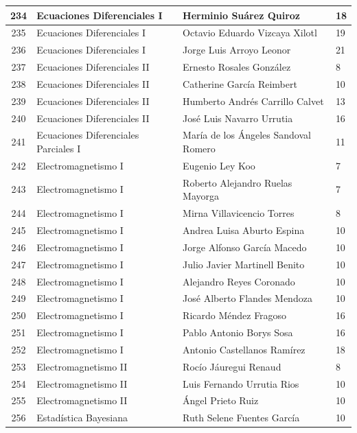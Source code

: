 {\begin{longtable}{|c|p{6.5cm}|p{5cm}|p{1.5cm}|}
  234 & Ecuaciones Diferenciales I & Herminio Suárez Quiroz & 18 \\ \hline
  235 & Ecuaciones Diferenciales I & Octavio Eduardo Vizcaya Xilotl & 19 \\ \hline
  236 & Ecuaciones Diferenciales I & Jorge Luis Arroyo Leonor & 21 \\ \hline
  237 & Ecuaciones Diferenciales II & Ernesto Rosales González & 8 \\ \hline
  238 & Ecuaciones Diferenciales II & Catherine García Reimbert & 10 \\ \hline
  239 & Ecuaciones Diferenciales II & Humberto Andrés Carrillo Calvet & 13 \\ \hline
  240 & Ecuaciones Diferenciales II & José Luis Navarro Urrutia & 16 \\ \hline
  241 & Ecuaciones Diferenciales Parciales I & María de los Ángeles Sandoval Romero & 11 \\ \hline
  242 & Electromagnetismo I & Eugenio Ley Koo & 7 \\ \hline
  243 & Electromagnetismo I & Roberto Alejandro Ruelas Mayorga & 7 \\ \hline
  244 & Electromagnetismo I & Mirna Villavicencio Torres & 8 \\ \hline
  245 & Electromagnetismo I & Andrea Luisa Aburto Espina & 10 \\ \hline
  246 & Electromagnetismo I & Jorge Alfonso García Macedo & 10 \\ \hline
  247 & Electromagnetismo I & Julio Javier Martinell Benito & 10 \\ \hline
  248 & Electromagnetismo I & Alejandro Reyes Coronado & 10 \\ \hline
  249 & Electromagnetismo I & José Alberto Flandes Mendoza & 10 \\ \hline
  250 & Electromagnetismo I & Ricardo Méndez Fragoso & 16 \\ \hline
  251 & Electromagnetismo I & Pablo Antonio Borys Sosa & 16 \\ \hline
  252 & Electromagnetismo I & Antonio Castellanos Ramírez & 18 \\ \hline
  253 & Electromagnetismo II & Rocío Jáuregui Renaud & 8 \\ \hline
  254 & Electromagnetismo II & Luis Fernando Urrutia Rios & 10 \\ \hline
  255 & Electromagnetismo II & Ángel Prieto Ruiz & 10 \\ \hline
  256 & Estadística Bayesiana & Ruth Selene Fuentes García & 10 \\ \hline

\end{longtable}}
